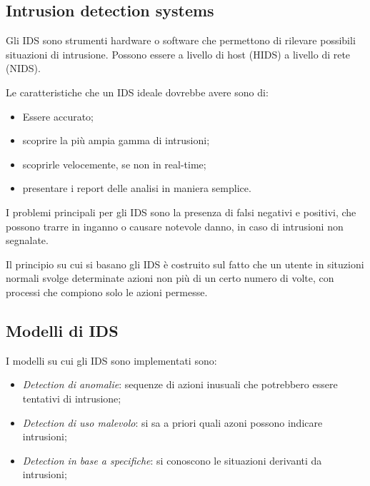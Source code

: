\documentclass[a4paper, 11pt]{article}
\begin{document}
\begin{multicols}{2}
	\section{Intrusion detection systems}
	Gli IDS sono strumenti hardware o software che permettono di rilevare possibili situazioni di intrusione. Possono essere a livello di host (HIDS) a livello di rete (NIDS).
	
	Le caratteristiche che un IDS ideale dovrebbe avere sono di:
	\begin{itemize}
		\item Essere accurato;
		\item scoprire la più ampia gamma di intrusioni;
		\item scoprirle velocemente, se non in real-time;
		\item presentare i report delle analisi in maniera semplice.
	\end{itemize}

	I problemi principali per gli IDS sono la presenza di falsi negativi e positivi, che possono trarre in inganno o causare notevole danno, in caso di intrusioni non segnalate. 
	
	Il principio su cui si basano gli IDS è costruito sul fatto che un utente in situzioni normali svolge determinate azioni non più di un certo numero di volte, con processi che compiono solo le azioni permesse.
	
	\subsection{Modelli di IDS}
	I modelli su cui gli IDS sono implementati sono:
	\begin{itemize}
		\item \textit{Detection di anomalie}: sequenze di azioni inusuali che potrebbero essere tentativi di intrusione;
		\item \textit{Detection di uso malevolo}: si sa a priori quali azoni possono indicare intrusioni;
		\item \textit{Detection in base a specifiche}: si conoscono le situazioni derivanti da intrusioni;
	\end{itemize}


\end{multicols}
\end{document}
